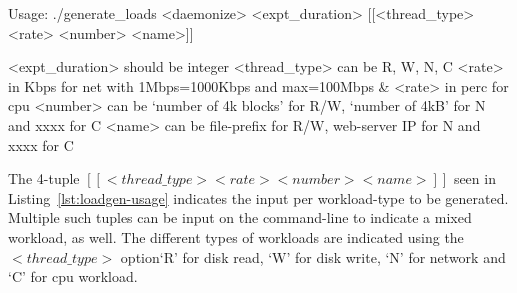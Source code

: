 \begin{snippet}
Usage: ./generate_loads <daemonize> <expt_duration> [[<thread_type> <rate> <number> <name>]]

<expt_duration> should be integer
<thread_type> can be R, W, N, C
<rate> in Kbps for net with 1Mbps=1000Kbps and max=100Mbps & <rate> in perc for cpu
<number> can be `number of 4k blocks' for R/W, `number of 4kB' for N and xxxx for C
<name> can be file-prefix for R/W, web-server IP for N and xxxx for C
\end{snippet}

The 4-tuple $[[<thread\_type> <rate> <number> <name>]]$ seen in Listing~\ref{lst:loadgen-usage}
indicates the input per workload-type to be generated. Multiple such tuples can be input
on the command-line to indicate a mixed workload, as well. The different types of workloads
are indicated using the $<thread\_type>$ option\textemdash{}`R' for disk read, `W' for disk write, 
`N' for network and `C' for cpu workload. 
